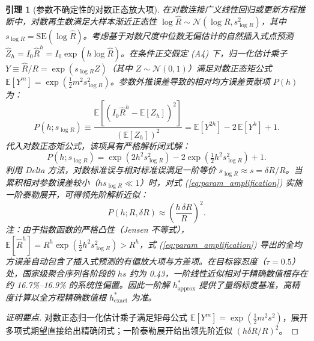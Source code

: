 \documentclass[10pt,a4paper]{article}
\theoremstyle{plain}
\newtheorem{lemma}{引理}
\theoremstyle{definition}
\begin{document}
\begin{lemma}[参数不确定性的对数正态放大项]\label{lem:param_amplification}
在对数连接广义线性回归或更新方程推断中，对数再生数满足大样本渐近正态性 $\log \hat{R} \sim \mathcal{N}(\log R, s_{\log R}^2)$，其中 $s_{\log R} = \text{SE}(\log \hat{R})$。考虑基于对数尺度中位数无偏估计的自然插入式点预测 $\hat{Z}_h = I_0 \hat{R}^h = I_0 \exp(h \log \hat{R})$。在条件正交假定 (A4) 下，归一化估计乘子 $Y \equiv \hat{R}/R = \exp(s_{\log R} Z)$（其中 $Z \sim \mathcal{N}(0, 1)$）满足对数正态矩公式 $\mathbb{E}[Y^m] = \exp(\tfrac{1}{2} m^2 s_{\log R}^2)$。参数外推误差导致的相对均方误差贡献项 $P(h)$ 为：
\begin{equation}
P(h; s_{\log R}) \equiv \frac{\mathbb{E}[(I_0 \hat{R}^h - \mathbb{E}[Z_h])^2]}{(\mathbb{E}[Z_h])^2} = \mathbb{E}\left[Y^{2h}\right] - 2\,\mathbb{E}\left[Y^{h}\right] + 1.
\end{equation}
代入对数正态矩公式，该项具有严格解析闭式解：
\begin{equation}
P(h; s_{\log R}) = \exp\!\left(2 h^2 s_{\log R}^2\right) - 2 \exp\!\left(\tfrac{1}{2} h^2 s_{\log R}^2\right) + 1.
\label{eq:param_amplification}
\end{equation}
利用 Delta 方法，对数标准误与相对标准误满足一阶等价 $s_{\log R} \approx s = \delta R / R$。当累积相对参数误差较小（$h s_{\log R} \ll 1$）时，对式 (\ref{eq:param_amplification}) 实施一阶泰勒展开，可得领先阶解析近似：
\begin{equation}
P(h; R, \delta R) \approx \left(\frac{h\,\delta R}{R}\right)^2.
\end{equation}
注：由于指数函数的严格凸性（Jensen 不等式），$\mathbb{E}[\hat{R}^h] = R^h \exp(\tfrac{1}{2}h^2 s_{\log R}^2) > R^h$，式 (\ref{eq:param_amplification}) 导出的全均方误差自动包含了插入式预测的有偏放大项与方差项。在目标容忍度（$\tau=0.5$）处，国家级聚合序列各阶段的 $h s$ 约为 0.43，一阶线性近似相对于精确数值根存在约 16.7\%--16.9\% 的系统性偏置。因此一阶解 $h^*_{\text{approx}}$ 提供了量纲标度基准，高精度计算以全方程精确数值根 $h^*_{\text{exact}}$ 为准。
\end{lemma}

\begin{proof}[证明要点]
对数正态归一化估计乘子满足矩母公式 $\mathbb{E}[Y^m]=\exp(\frac{1}{2}m^2 s^2)$，展开多项式期望直接给出精确闭式；一阶泰勒展开给出领先阶近似 $(h\delta R/R)^2$。
\end{proof}
\end{document}
